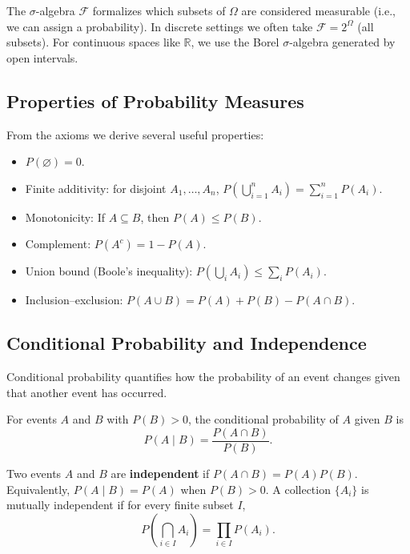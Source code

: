 \documentclass{tufte-handout}
\begin{document}
The $\sigma$-algebra $\mathcal{F}$ formalizes which subsets of $\Omega$ are considered measurable (i.e., we can assign a probability). In discrete settings we often take $\mathcal{F} = 2^{\Omega}$ (all subsets). For continuous spaces like $\mathbb{R}$, we use the Borel $\sigma$-algebra generated by open intervals.

\subsection{Properties of Probability Measures}

From the axioms we derive several useful properties:
\begin{itemize}
    \item $P(\varnothing) = 0$.
    \item Finite additivity: for disjoint $A_1,\dots,A_n$, $P(\bigcup_{i=1}^n A_i) = \sum_{i=1}^n P(A_i)$.
    \item Monotonicity: If $A \subseteq B$, then $P(A) \le P(B)$.
    \item Complement: $P(A^c) = 1 - P(A)$.
    \item Union bound (Boole's inequality): $P(\bigcup_i A_i) \le \sum_i P(A_i)$.
    \item Inclusion–exclusion: $P(A \cup B) = P(A) + P(B) - P(A \cap B)$.
\end{itemize}

\subsection{Conditional Probability and Independence}

Conditional probability quantifies how the probability of an event changes given that another event has occurred.

\begin{defn}
    For events $A$ and $B$ with $P(B) > 0$, the conditional probability of $A$ given $B$ is
    \[
    P(A \mid B) = \frac{P(A \cap B)}{P(B)}.
    \]
\end{defn}

\begin{defn}[Independence]
    Two events $A$ and $B$ are \textbf{independent} if $P(A \cap B) = P(A)P(B)$. Equivalently, $P(A \mid B) = P(A)$ when $P(B)>0$. A collection $\{A_i\}$ is mutually independent if for every finite subset $I$,
    \[
    P\!\left(\bigcap_{i \in I} A_i\right) = \prod_{i \in I} P(A_i).
    \]
\end{defn}
\end{document}
